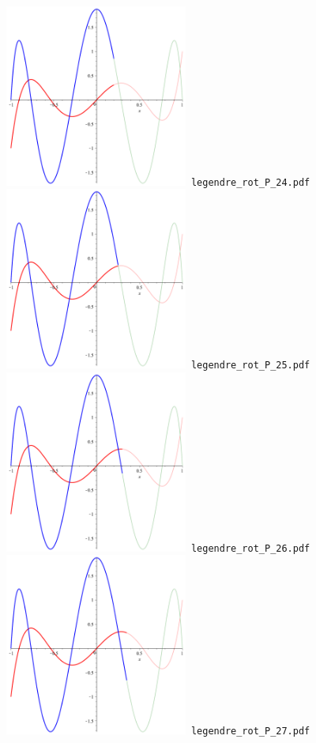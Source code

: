 \documentclass[a4paper]{amsart}
\begin{document}
\includegraphics[width=6cm]{legendre_rot_P_24.pdf}\verb+ legendre_rot_P_24.pdf+\\
\includegraphics[width=6cm]{legendre_rot_P_25.pdf}\verb+ legendre_rot_P_25.pdf+\\
\includegraphics[width=6cm]{legendre_rot_P_26.pdf}\verb+ legendre_rot_P_26.pdf+\\
\includegraphics[width=6cm]{legendre_rot_P_27.pdf}\verb+ legendre_rot_P_27.pdf+\\
\end{document}

